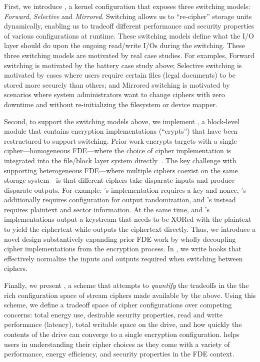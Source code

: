 First, we introduce \sysA, a kernel configuration that exposes three switching
models: {\em Forward}, {\em Selective} and {\em Mirrored}. Switching allows  us
to ``re-cipher'' storage units dynamically, enabling us to tradeoff different
performance and security properties of various configurations at runtime. These
switching models define what the I/O layer should do upon the ongoing read/write
I/Os during the switching. These three switching models are motivated by real
case studies. For examples, Forward switching is motivated by the battery case
study above; Selective switching is motivated by cases where users require
certain files (\eg legal documents) to be stored more securely than others; and
Mirrored switching is motivated by scenarios where system administrators want to
change ciphers with zero downtime and without re-initializing the filesystem or
device mapper.

Second, to support the switching models above, we implement \sysB, a block-level
module that contains encryption implementations (``crypts'') that have been
restructured to support switching. Prior work encrypts targets with a single
cipher---\ie homogeneous FDE---where the choice of cipher implementation is
integrated into the file/block layer system directly~\cite{StrongBox, dmcrypt}.
The key challenge with supporting heterogeneous FDE---where multiple ciphers
coexist on the same storage system---is that different ciphers take disparate
inputs and produce disparate outputs. For example: \encB's implementation
requires a key and nonce, \encA's additionally requires configuration for output
randomization, and \encC's instead requires plaintext and sector information. At
the same time, \encA and \encB's implementations output a keystream that needs
to be XORed with the plaintext to yield the ciphertext while \encC outputs the
ciphertext directly. Thus, we introduce a novel design substantively expanding
prior FDE work by wholly decoupling cipher implementations from the encryption
process. In \sysB, we write hooks that effectively normalize the inputs and
outputs required when switching between ciphers.

Finally, we present \sysC, a scheme that attempts to {\em quantify} the
tradeoffs in the the rich configuration space of stream ciphers made available
by the above. Using this scheme, we define a tradeoff space of cipher
configurations over competing concerns: total energy use, desirable security
properties, read and write performance (latency), total writable space on the
drive, and how quickly the contents of the drive can converge to a single
encryption configuration. \sysC helps users in understanding their cipher
choices as they come with a variety of performance, energy efficiency, and
security properties in the FDE context.

